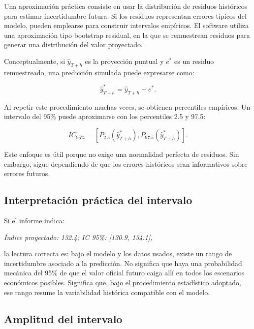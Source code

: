 Una aproximación práctica consiste en usar la distribución de residuos históricos para estimar incertidumbre futura. Si los residuos representan errores típicos del modelo, pueden emplearse para construir intervalos empíricos. El software utiliza una aproximación tipo bootstrap residual, en la que se remuestrean residuos para generar una distribución del valor proyectado.

Conceptualmente, si \(\hat{y}_{T+h}\) es la proyección puntual y \(e^{\ast}\) es un residuo remuestreado, una predicción simulada puede expresarse como:

\begin{equation}
    \hat{y}^{\ast}_{T+h} = \hat{y}_{T+h} + e^{\ast}.
    \label{eq:bootstrap_residual}
\end{equation}

Al repetir este procedimiento muchas veces, se obtienen percentiles empíricos. Un intervalo del 95\% puede aproximarse con los percentiles 2.5 y 97.5:

\begin{equation}
    IC_{95\%} = \left[P_{2.5}(\hat{y}^{\ast}_{T+h}), P_{97.5}(\hat{y}^{\ast}_{T+h})\right].
    \label{eq:ic_percentiles}
\end{equation}

Este enfoque es útil porque no exige una normalidad perfecta de residuos. Sin embargo, sigue dependiendo de que los errores históricos sean informativos sobre errores futuros.

\subsection{Interpretación práctica del intervalo}

Si el informe indica:

\begin{center}
\textit{Índice proyectado: 132.4; IC 95\%: [130.9, 134.1],}
\end{center}

la lectura correcta es: bajo el modelo y los datos usados, existe un rango de incertidumbre asociado a la predicción. No significa que haya una probabilidad mecánica del 95\% de que el valor oficial futuro caiga allí en todos los escenarios económicos posibles. Significa que, bajo el procedimiento estadístico adoptado, ese rango resume la variabilidad histórica compatible con el modelo.

\subsection{Amplitud del intervalo}

